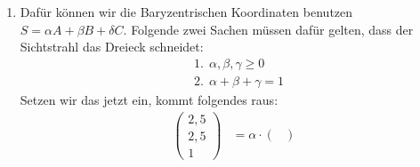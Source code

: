 \documentclass[11pt]{article}
\begin{document}
\begin{enumerate}
\begin{align*}
\begin{pmatrix*}
    1
  \end{pmatrix*} = 1 \cdot 1 + 1 \cdot 1 + 1 \cdot 0 = 2
\end{align*}
Jetzt können wir $t$ bestimmen: 
\begin{align*}
  t &= \frac{6 - (-1)}{2} = \frac{7}{2} = 3.5
\end{align*}
Jetzt setzen wir das $t$ in die Strahlengleichung $r(t)$ ein um den Schnittpunkt zu bestimmen:
\begin{align*}
  r(3.5) &= \begin{pmatrix*}
    -1\\
    -1\\
    1
  \end{pmatrix*} + 3.5 \cdot \begin{pmatrix*}
    1\\
    1\\
    0
  \end{pmatrix*} = \begin{pmatrix*}
    -1 + 3.5\\
    -1 + 3.5\\
    1 + 0
  \end{pmatrix*} = \begin{pmatrix*}
    2.5\\
    2.5\\
    1
  \end{pmatrix*}
\end{align*} \\ \\
Also ist der Schnittpunkt $S = \begin{pmatrix*}
    2.5\\
    2.5\\
    1
  \end{pmatrix*}$.
\item Dafür können wir die Baryzentrischen Koordinaten benutzen $S = \alpha A + \beta B + \delta C$. Folgende zwei Sachen müssen dafür gelten, dass der Sichtstrahl das Dreieck schneidet:
\begin{align*}
  &1.~~\alpha, \beta, \gamma \geq 0 \\
  &2.~~\alpha + \beta + \gamma = 1
\end{align*}
Setzen wir das jetzt ein, kommt folgendes raus:
\begin{align*}
 \begin{pmatrix*}
    2,5 \\
    2,5 \\
    1
  \end{pmatrix*} &= \alpha \cdot \begin{pmatrix*}

\end{pmatrix*}
\end{align*}
\end{enumerate}
\end{document}
